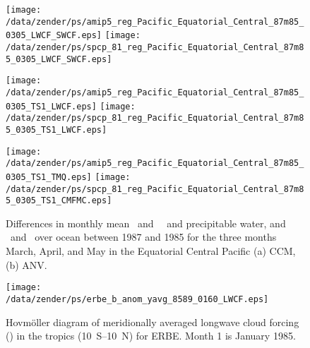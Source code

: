 \documentclass[agupp]{aguplus}
\begin{document}
\begin{figure*}
\texttt{[image: /data/zender/ps/amip5\_reg\_Pacific\_Equatorial\_Central\_87m85\_0305\_LWCF\_SWCF.eps]}
\texttt{[image: /data/zender/ps/spcp\_81\_reg\_Pacific\_Equatorial\_Central\_87m85\_0305\_LWCF\_SWCF.eps]}

\texttt{[image: /data/zender/ps/amip5\_reg\_Pacific\_Equatorial\_Central\_87m85\_0305\_TS1\_LWCF.eps]}
\texttt{[image: /data/zender/ps/spcp\_81\_reg\_Pacific\_Equatorial\_Central\_87m85\_0305\_TS1\_LWCF.eps]}

\texttt{[image: /data/zender/ps/amip5\_reg\_Pacific\_Equatorial\_Central\_87m85\_0305\_TS1\_TMQ.eps]}
\texttt{[image: /data/zender/ps/spcp\_81\_reg\_Pacific\_Equatorial\_Central\_87m85\_0305\_TS1\_CMFMC.eps]}
\caption{Differences in monthly mean \SST\ and \LWCF\,
\SST\ and precipitable water, and \SST\ and \Mc\ over ocean between
1987 and 1985 for the three months March, April, and May in the
Equatorial Central Pacific (a) CCM, (b) ANV.
\label{fig:reg_Pacific_Equatorial_87m85_0305_TS1_CMFMC}}   
\end{figure*}

\begin{figure*}
\centering
\texttt{[image: /data/zender/ps/erbe\_b\_anom\_yavg\_8589\_0160\_LWCF.eps]}%
\caption{Hovm\"oller diagram of meridionally averaged longwave cloud
forcing (\wxmS ) in the tropics (10~\degreee S--10~\degreee N) for
ERBE.
Month 1 is January 1985.  
\label{fig:anom_yavg_8589_0160_b}}   
\end{figure*}
\end{document}
